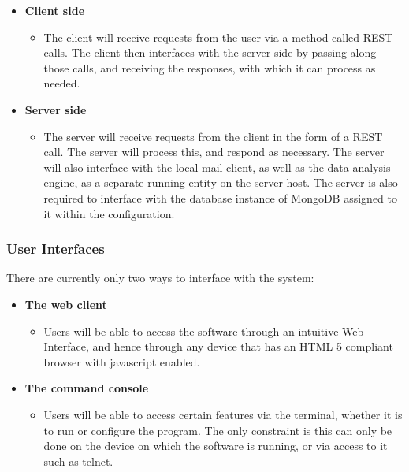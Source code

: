 \documentclass[a4paper,12pt]{article}
\begin{document}
        	\begin{itemize}
        		\item \textbf{Client side}
	        	\begin{itemize}
	        		\item The client will receive requests from the user via a method called REST calls. The client then interfaces with the server side by passing along those calls, and receiving the responses, with which it can process as needed.
	        	\end{itemize}
        	\end{itemize}
        
        	\begin{itemize}
	        	\item \textbf{Server side}
	        	\begin{itemize}
	        		\item The server will receive requests from the client in the form of a REST call. The server will process this, and respond as necessary. The server will also interface with the local mail client, as well as the data analysis engine, as a separate running entity on the server host. The server is also required to interface with the database instance of MongoDB assigned to it within the configuration.
	        	\end{itemize}
        	\end{itemize}
        	
            \subsubsection{User Interfaces}
            
            There are currently only two ways to interface with the system:
           	
           	\begin{itemize}
            	\item \textbf{The web client}
            	\begin{itemize}
            		\item Users will be able to access the software through an intuitive Web
            		Interface, and hence through any device that has an HTML 5 compliant browser with javascript enabled.
            	\end{itemize}
            \end{itemize}
        
        	\begin{itemize}
        		\item \textbf{The command console}
        		\begin{itemize}
        			\item Users will be able to access certain features via the terminal, whether it is to run or configure the program. The only constraint is this can only be done on the device on which the software is running, or via access to it such as telnet.
        		\end{itemize}
        	\end{itemize}
            
\end{document}
